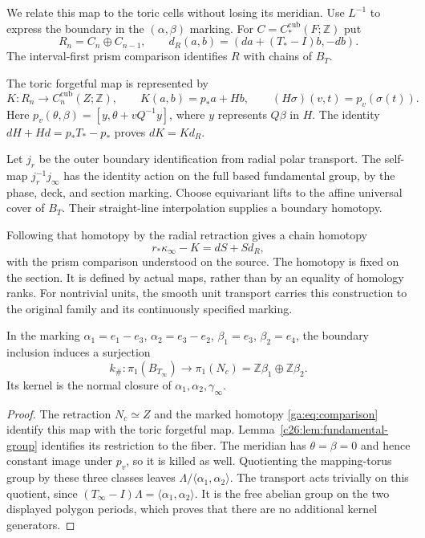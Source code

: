 We relate this map to the toric cells without losing its meridian.
Use $L^{-1}$ to express the boundary in the $(\alpha,\beta)$ marking.
For $C=C_*^{\mathrm{cub}}(F;\mathbb Z)$ put
\[
R_n=C_n\oplus C_{n-1},\qquad
d_R(a,b)=(da+(T_*-I)b,-db).
\]
The interval-first prism comparison identifies $R$ with chains of $B_T$.

The toric forgetful map is represented by
\begin{equation}\label{ga:eq:K}
K:R_n\longrightarrow C_n^{\mathrm{cub}}(Z;\mathbb Z),
\qquad K(a,b)=p_*a+Hb,
\qquad (H\sigma)(v,t)=p_v(\sigma(t)).
\end{equation}
Here $p_v(\theta,\beta)=[y,\theta+vQ^{-1}y]$,
where $y$ represents $Q\beta$ in $H$.
The identity $dH+Hd=p_*T_*-p_*$ proves $dK=Kd_R$.

Let $j_r$ be the outer boundary identification from radial polar transport.
The self-map $j_r^{-1}j_\infty$ has the identity action on the full
based fundamental group, by the phase, deck, and section marking.
Choose equivariant lifts to the affine universal cover of $B_T$.
Their straight-line interpolation supplies a boundary homotopy.

Following that homotopy by the radial retraction gives a chain homotopy
\begin{equation}\label{ga:eq:comparison}
r_*\kappa_\infty-K=dS+Sd_R,
\end{equation}
with the prism comparison understood on the source.
The homotopy is fixed on the section.
It is defined by actual maps, rather than by an equality of homology ranks.
For nontrivial units, the smooth unit transport carries this construction
to the original family and its continuously specified marking.

\begin{lemma}\label{ga:lem:fundamental-group}
In the marking
$\alpha_1=e_1-e_3$, $\alpha_2=e_3-e_2$,
$\beta_1=e_3$, $\beta_2=e_4$, the boundary inclusion induces a
surjection
\[
 k_\#: \pi_1(B_{T_\infty})\longrightarrow\pi_1(N_c)
       =\mathbb Z\beta_1\oplus\mathbb Z\beta_2.
\]
Its kernel is the normal closure of
$\alpha_1,\alpha_2,\gamma_\infty$.
\end{lemma}

\begin{proof}
The retraction $N_c\simeq Z$ and the marked homotopy
\eqref{ga:eq:comparison} identify this map with the toric forgetful map.
Lemma~\ref{c26:lem:fundamental-group} identifies its restriction to the
fiber. The meridian has $\theta=\beta=0$ and hence constant image under
$p_v$, so it is killed as well. Quotienting the mapping-torus group by
these three classes leaves $\Lambda/\langle\alpha_1,\alpha_2\rangle$.
The transport acts trivially on this quotient, since
$(T_\infty-I)\Lambda=\langle\alpha_1,\alpha_2\rangle$.
It is the free abelian group on the two displayed polygon periods,
which proves that there are no additional kernel generators.
\end{proof}

